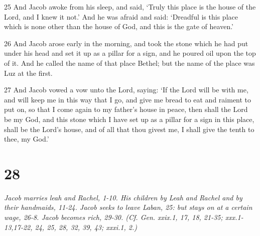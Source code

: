 \par 25 And Jacob awoke from his sleep, and said, ‘Truly this place is the house of the Lord, and I knew it not.’ And he was afraid and said: ‘Dreadful is this place which is none other than the house of God, and this is the gate of heaven.’
\par 26 And Jacob arose early in the morning, and took the stone which he had put under his head and set it up as a pillar for a sign, and he poured oil upon the top of it. And he called the name of that place Bethel; but the name of the place was Luz at the first.
\par 27 And Jacob vowed a vow unto the Lord, saying: ‘If the Lord will be with me, and will keep me in this way that I go, and give me bread to eat and raiment to put on, so that I come again to my father's house in peace, then shall the Lord be my God, and this stone which I have set up as a pillar for a sign in this place, shall be the Lord's house, and of all that thou givest me, I shall give the tenth to thee, my God.’

\chapter{28}

\par \textit{Jacob marries leah and Rachel, 1-10. His children by Leah and Rachel and by their handmaids, 11-24. Jacob seeks to leave Laban, 25: but stays on at a certain wage, 26-8. Jacob becomes rich, 29-30. (Cf. Gen. xxix.1, 17, 18, 21-35; xxx.1-13,17-22, 24, 25, 28, 32, 39, 43; xxxi.1, 2.)}

